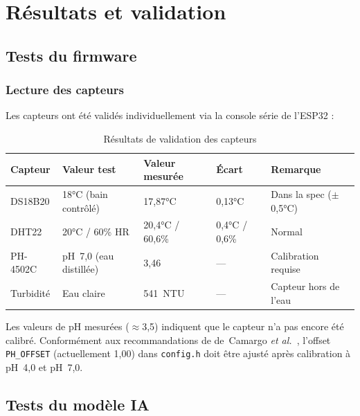\documentclass[12pt,a4paper]{report}
\newcommand{\code}[1]{\texttt{\small\colorbox{codebg}{#1}}}
\begin{document}
\chapter{Résultats et validation}

\section{Tests du firmware}

\subsection{Lecture des capteurs}

Les capteurs ont été validés individuellement via la console série de l'ESP32 :

\begin{table}[H]
\centering
\caption{Résultats de validation des capteurs}
\label{tab:validation}
\begin{tabularx}{\textwidth}{@{}L{3cm}L{3cm}C{2cm}C{2cm}L{4cm}@{}}
\toprule
\textbf{Capteur} & \textbf{Valeur test} & \textbf{Valeur mesurée} & \textbf{Écart} & \textbf{Remarque} \\
\midrule
DS18B20  & 18°C (bain contrôlé) & 17,87°C          & 0,13°C & Dans la spec ($\pm$0,5°C) \\
DHT22    & 20°C / 60\% HR       & 20,4°C / 60,6\%  & 0,4°C / 0,6\% & Normal \\
PH-4502C & pH~7,0 (eau distillée) & 3,46           & ---    & Calibration requise \\
Turbidité & Eau claire           & 541~NTU          & ---    & Capteur hors de l'eau \\
\bottomrule
\end{tabularx}
\end{table}

\begin{warningbox}
Les valeurs de pH mesurées ($\approx$3,5) indiquent que le capteur n'a pas encore
été calibré. Conformément aux recommandations de de~Camargo \textit{et al.}~\cite{camargo2023lowcost},
l'offset \code{PH\_OFFSET} (actuellement 1,00) dans \code{config.h} doit être
ajusté après calibration à pH~4,0 et pH~7,0.
\end{warningbox}

\section{Tests du modèle IA}
\end{document}
